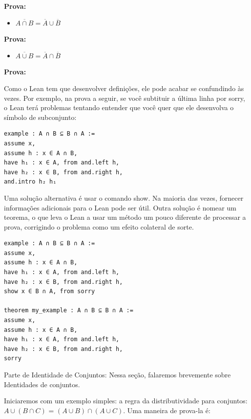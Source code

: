 \textbf{Prova:}

\begin{itemize}
    \item $\overline {A \cap B } = \overline A \cup\overline B$
\end{itemize}

\textbf{Prova:}

\begin{itemize}
    \item $\overline {A \cup B } = \overline A \cap\overline B$
\end{itemize}

\textbf{Prova:}

Como o Lean tem que desenvolver definições, ele pode acabar se confundindo às vezes. Por exemplo, na prova a seguir, se você subtituir a última linha por{
\selectfont sorry}, o Lean terá problemas tentando entender que você quer que ele desenvolva o símbolo de subconjunto:

\begin{lstlisting}
example : A ∩ B ⊆ B ∩ A :=
assume x,
assume h : x ∈ A ∩ B,
have h₁ : x ∈ A, from and.left h,
have h₂ : x ∈ B, from and.right h,
and.intro h₂ h₁ \end{lstlisting}

Uma solução alternativa é usar o comando{
\selectfont show}. Na maioria das vezes, fornecer informações adicionais para o Lean pode ser útil. Outra solução é nomear um teorema, o que leva o Lean a usar um método um pouco diferente de processar a prova, corrigindo o problema como um efeito colateral de sorte.

\begin{lstlisting}
example : A ∩ B ⊆ B ∩ A :=
assume x,
assume h : x ∈ A ∩ B,
have h₁ : x ∈ A, from and.left h,
have h₂ : x ∈ B, from and.right h,
show x ∈ B ∩ A, from sorry

theorem my_example : A ∩ B ⊆ B ∩ A :=
assume x,
assume h : x ∈ A ∩ B,
have h₁ : x ∈ A, from and.left h,
have h₂ : x ∈ B, from and.right h,
sorry \end{lstlisting}

Parte de Identidade de Conjuntos: Nessa seção, falaremos brevemente sobre Identidades de conjuntos.

Iniciaremos com um exemplo simples: a regra da distributividade para conjuntos: $A \cup (B \cap C)$ = $(A \cup B) \cap (A \cup C)$. Uma maneira de prova-la é:


